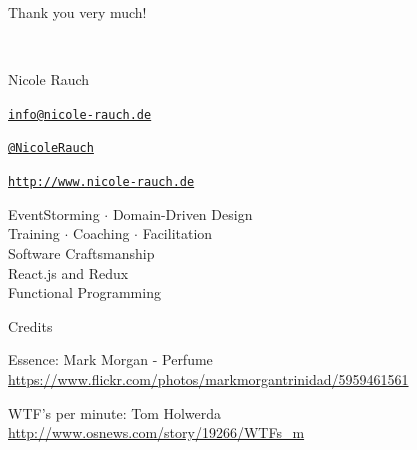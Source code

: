 \begin{frame}{Thank you very much!}

  ~\\[1em]
  \begin{block}{Nicole Rauch}
    \begin{description}[Twitterxx]
    \item[E-Mail]  \href{mailto:info@nicole-rauch.de}{\texttt{info@nicole-rauch.de}}
    \item[Twitter] \href{http://twitter.com/NicoleRauch}{\texttt{@NicoleRauch}}
    \item[Web] \href{http://www.nicole-rauch.de}{\texttt{http://www.nicole-rauch.de}}
    \end{description}
  \end{block}

\begin{center}
EventStorming $\cdot$ Domain-Driven Design \\
Training $\cdot$ Coaching $\cdot$ Facilitation \\
Software Craftsmanship \\ 
React.js and Redux  \\
Functional Programming
\end{center}  

\end{frame}


\begin{frame}{Credits}

Essence: Mark Morgan - Perfume
{\footnotesize \url{https://www.flickr.com/photos/markmorgantrinidad/5959461561}}

WTF's per minute: Tom Holwerda
{\footnotesize \url{http://www.osnews.com/story/19266/WTFs_m}}

\end{frame}
